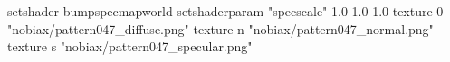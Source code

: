 setshader bumpspecmapworld
setshaderparam "specscale" 1.0 1.0 1.0
   texture 0 "nobiax/pattern047_diffuse.png"
   texture n "nobiax/pattern047_normal.png"
   texture s "nobiax/pattern047_specular.png"